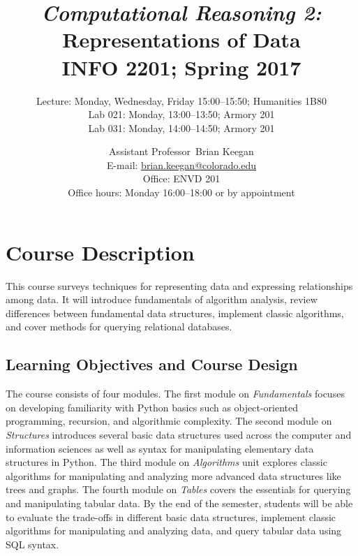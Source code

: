\documentclass[10pt]{memoir}
\makeatletter
\def\myauthor{Brian Keegan}
\def\mycoursename{Computational Reasoning 2}
\def\mycourselisting{INFO 2201}
\def\myoffice{ENVD 201}
\def\myclassroom{Humanities 1B80}
\def\mymeetingtime{Monday, Wednesday, Friday 15:00--15:50}
\def\mydate{Spring 2017}
\def\myemail{brian.keegan@colorado.edu}
\def\myofficehours{Monday 16:00--18:00 or by appointment}
\def\mytitle{Assistant Professor}
\makeatother
\begin{document}
\nobibliography*


\title{
    \textit{\normalsize{\textcolor{CUGold}{\textbf{\mycoursename:}}}}\\
    \textbf{\huge{Representations of Data}}\\
    \vspace{5pt} \normalsize{\mycourselisting}; \mydate
    }

\author{
Lecture: \mymeetingtime; \myclassroom\\
Lab 021: Monday, 13:00--13:50; Armory 201 \\
Lab 031: Monday, 14:00--14:50; Armory 201 \\ 
}

\date{\normalsize{\mytitle~\myauthor\\
       E-mail: \href{mailto:\myemail}{\myemail}\\
       Office: \myoffice\\
       Office hours: \myofficehours}}

\maketitle


\section{\textbf{Course Description}}

This course surveys techniques for representing data and expressing relationships among data. It will introduce fundamentals of algorithm analysis, review differences between fundamental data structures, implement classic algorithms, and cover methods for querying relational databases.

\subsection{Learning Objectives and Course Design}
The course consists of four modules. The first module on \textit{Fundamentals} focuses on developing familiarity with Python basics such as object-oriented programming, recursion, and algorithmic complexity. The second module on \textit{Structures} introduces several basic data structures used across the computer and information sciences as well as syntax for manipulating elementary data structures in Python. The third module on \textit{Algorithms} unit explores classic algorithms for manipulating and analyzing more advanced data structures like trees and graphs. The fourth module on \textit{Tables} covers the essentials for querying and manipulating tabular data. By the end of the semester, students will be able to evaluate the trade-offs in different basic data structures, implement classic algorithms for manipulating and analyzing data, and query tabular data using SQL syntax.
\end{document}
